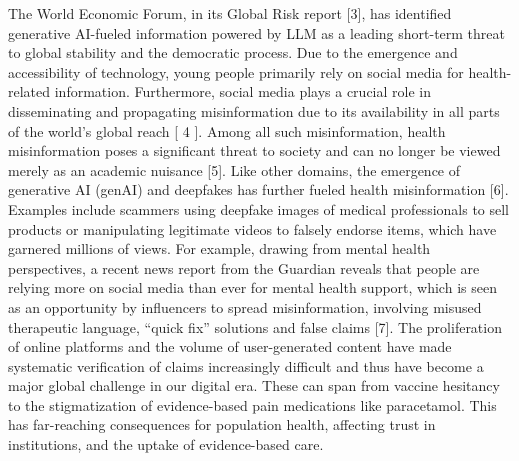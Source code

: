\documentclass[]{article}
\begin{document}
The World Economic Forum, in its Global Risk report {[}3{]}, has
identified generative AI-fueled information powered by LLM as a leading short-term
threat to global stability and the democratic process. Due to the emergence and accessibility of technology, young people primarily rely on social media for health-related information. Furthermore, social media
plays a crucial role in disseminating and propagating misinformation due to its availability in all parts of the
world's global reach {[} 4 {]}. Among all such misinformation, health
misinformation poses a significant threat to society and can no longer be
viewed merely as an academic nuisance {[}5{]}. Like other domains, the
emergence of generative AI (genAI) and deepfakes has further fueled
health misinformation {[}6{]}. Examples include scammers using deepfake
images of medical professionals to sell products or manipulating
legitimate videos to falsely endorse items, which have garnered millions
of views. For example, drawing from mental health perspectives, a recent
news report from the Guardian reveals that people are relying more on
social media than ever for mental health support, which is seen as an
opportunity by influencers to spread misinformation, involving misused
therapeutic language, ``quick fix'' solutions and false claims {[}7{]}.
The proliferation of online platforms and the volume of user-generated content have made systematic verification of claims increasingly difficult and thus have become a major global challenge in our digital era. These can span from vaccine
hesitancy to the stigmatization of evidence-based pain medications like
paracetamol. This has far-reaching consequences for population health,
affecting trust in institutions, and the uptake of evidence-based care.
\end{document}
